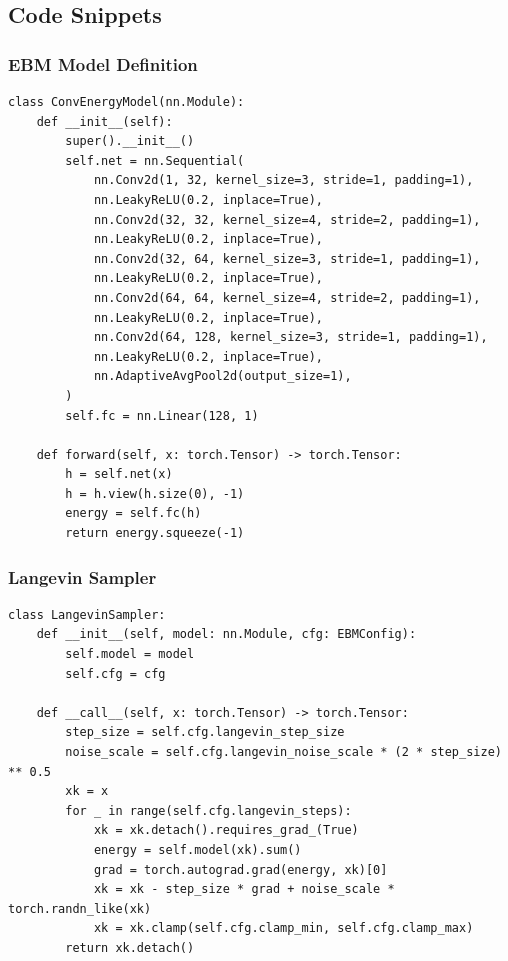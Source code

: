 \documentclass[a4paper,12pt]{article}
\begin{document}
\subsection{Code Snippets}
\subsubsection{EBM Model Definition}
\begin{verbatim}
class ConvEnergyModel(nn.Module):
    def __init__(self):
        super().__init__()
        self.net = nn.Sequential(
            nn.Conv2d(1, 32, kernel_size=3, stride=1, padding=1),
            nn.LeakyReLU(0.2, inplace=True),
            nn.Conv2d(32, 32, kernel_size=4, stride=2, padding=1),
            nn.LeakyReLU(0.2, inplace=True),
            nn.Conv2d(32, 64, kernel_size=3, stride=1, padding=1),
            nn.LeakyReLU(0.2, inplace=True),
            nn.Conv2d(64, 64, kernel_size=4, stride=2, padding=1),
            nn.LeakyReLU(0.2, inplace=True),
            nn.Conv2d(64, 128, kernel_size=3, stride=1, padding=1),
            nn.LeakyReLU(0.2, inplace=True),
            nn.AdaptiveAvgPool2d(output_size=1),
        )
        self.fc = nn.Linear(128, 1)

    def forward(self, x: torch.Tensor) -> torch.Tensor:
        h = self.net(x)
        h = h.view(h.size(0), -1)
        energy = self.fc(h)
        return energy.squeeze(-1)
\end{verbatim}

\subsubsection{Langevin Sampler}
\begin{verbatim}
class LangevinSampler:
    def __init__(self, model: nn.Module, cfg: EBMConfig):
        self.model = model
        self.cfg = cfg

    def __call__(self, x: torch.Tensor) -> torch.Tensor:
        step_size = self.cfg.langevin_step_size
        noise_scale = self.cfg.langevin_noise_scale * (2 * step_size) ** 0.5
        xk = x
        for _ in range(self.cfg.langevin_steps):
            xk = xk.detach().requires_grad_(True)
            energy = self.model(xk).sum()
            grad = torch.autograd.grad(energy, xk)[0]
            xk = xk - step_size * grad + noise_scale * torch.randn_like(xk)
            xk = xk.clamp(self.cfg.clamp_min, self.cfg.clamp_max)
        return xk.detach()
\end{verbatim}
\end{document}
